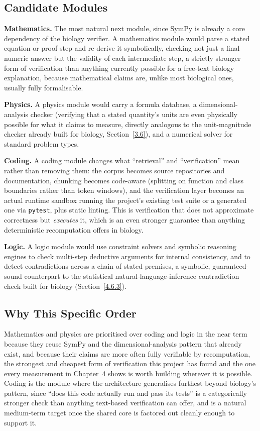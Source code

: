 \subsection{Candidate Modules}\label{5.4.2}

\textbf{Mathematics.} The most natural next module, since SymPy
\cite{meurer2017sympy} is already a core dependency of the biology
verifier. A mathematics module would parse a stated equation or proof step
and re-derive it symbolically, checking not just a final numeric answer
but the validity of each intermediate step, a strictly stronger form of
verification than anything currently possible for a free-text biology
explanation, because mathematical claims are, unlike most biological ones,
usually fully formalisable.

\textbf{Physics.} A physics module would carry a formula database, a
dimensional-analysis checker (verifying that a stated quantity's units are
even physically possible for what it claims to measure, directly
analogous to the unit-magnitude checker already built for biology,
Section~\ref{3.6}), and a numerical solver for standard problem types.

\textbf{Coding.} A coding module changes what ``retrieval'' and
``verification'' mean rather than removing them: the corpus becomes source
repositories and documentation, chunking becomes code-aware (splitting on
function and class boundaries rather than token windows), and the
verification layer becomes an actual runtime sandbox running the
project's existing test suite or a generated one via \texttt{pytest},
plus static linting. This is verification that does not approximate
correctness but \emph{executes} it, which is an even stronger guarantee
than anything deterministic recomputation offers in biology.

\textbf{Logic.} A logic module would use constraint solvers and symbolic
reasoning engines to check multi-step deductive arguments for internal
consistency, and to detect contradictions across a chain of stated
premises, a symbolic, guaranteed-sound counterpart to the statistical
natural-language-inference contradiction check built for biology
(Section~\ref{4.6.3}).

\subsection{Why This Specific Order}\label{5.4.3}

Mathematics and physics are prioritised over coding and logic in the
near term because they reuse SymPy and the dimensional-analysis pattern
that already exist, and because their claims are more often fully
verifiable by recomputation, the strongest and cheapest form of
verification this project has found and the one every measurement in
Chapter~4 shows is worth building wherever it is possible. Coding is the
module where the architecture generalises furthest beyond biology's
pattern, since ``does this code actually run and pass its tests'' is a
categorically stronger check than anything text-based verification can
offer, and is a natural medium-term target once the shared core is
factored out cleanly enough to support it.

